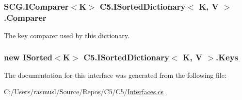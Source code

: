 \subsubsection[{Comparer}]{\setlength{\rightskip}{0pt plus 5cm}S\+C\+G.\+I\+Comparer$<$K$>$ {\bf C5.\+I\+Sorted\+Dictionary}$<$ K, V $>$.Comparer\hspace{0.3cm}{\ttfamily [get]}}\label{interface_c5_1_1_i_sorted_dictionary_ad563257346c1cdcae8d37e94e335b16c}


The key comparer used by this dictionary. 

\hypertarget{interface_c5_1_1_i_sorted_dictionary_ab85b9ffde0b897778957f3108539ee76}{}
\subsubsection[{Keys}]{\setlength{\rightskip}{0pt plus 5cm}new {\bf I\+Sorted}$<$K$>$ {\bf C5.\+I\+Sorted\+Dictionary}$<$ K, V $>$.Keys\hspace{0.3cm}{\ttfamily [get]}}\label{interface_c5_1_1_i_sorted_dictionary_ab85b9ffde0b897778957f3108539ee76}






The documentation for this interface was generated from the following file\+:\begin{DoxyCompactItemize}
\item 
C\+:/\+Users/rasmusl/\+Source/\+Repos/\+C5/\+C5/\hyperlink{_interfaces_8cs}{Interfaces.\+cs}\end{DoxyCompactItemize}
